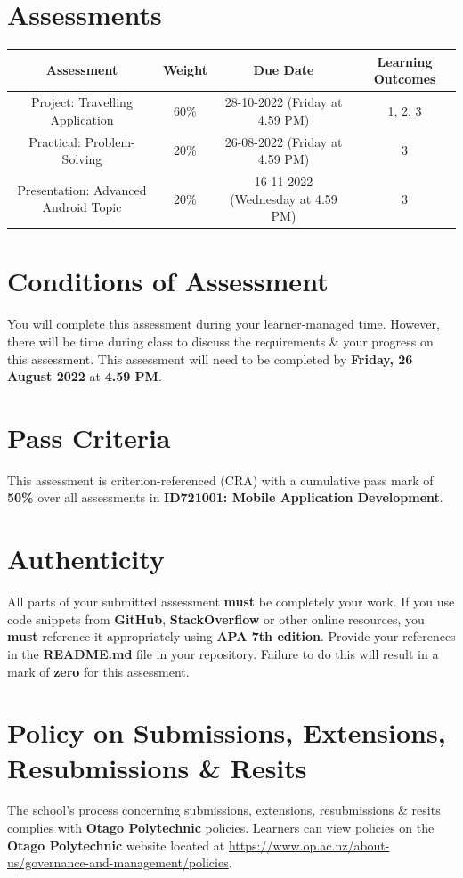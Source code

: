 \documentclass{article}
\begin{document}
\section*{Assessments}
\renewcommand{\arraystretch}{1.5}
\begin{tabular}{|c|c|c|c|}
	\hline
	\textbf{Assessment} & \textbf{Weight} & \textbf{Due Date}    & \textbf{Learning Outcomes} \\ \hline
	Project: Travelling Application             & 60\%            & 28-10-2022 (Friday at 4.59 PM)  & 1, 2, 3                    \\ \hline
	Practical: Problem-Solving          & 20\%            & 26-08-2022 (Friday at 4.59 PM) & 3                    \\ \hline
	Presentation: Advanced Android Topic        & 20\%            & 16-11-2022 (Wednesday at 4.59 PM) & 3                       \\ \hline
\end{tabular}

\section*{Conditions of Assessment}
You will complete this assessment during your learner-managed time. However, there will be time during class to discuss the requirements \& your progress on this assessment. This assessment will need to be completed by \textbf{Friday, 26 August 2022} at \textbf{4.59 PM}.

\section*{Pass Criteria}
This assessment is criterion-referenced (CRA) with a cumulative pass mark of \textbf{50\%} over all assessments in \textbf{ID721001: Mobile Application Development}.

\section*{Authenticity}
All parts of your submitted assessment \textbf{must} be completely your work. If you use code snippets from \textbf{GitHub}, \textbf{StackOverflow} or other online resources, you \textbf{must} reference it appropriately using \textbf{APA 7th edition}. Provide your references in the \textbf{README.md} file in your repository. Failure to do this will result in a mark of \textbf{zero} for this assessment.

\section*{Policy on Submissions, Extensions, Resubmissions \& Resits}
The school's process concerning submissions, extensions, resubmissions \& resits complies with \textbf{Otago Polytechnic} policies. Learners can view policies on the \textbf{Otago Polytechnic} website located at \href{https://www.op.ac.nz/about-us/governance-and-management/policies}{https://www.op.ac.nz/about-us/governance-and-management/policies}.
\end{document}
